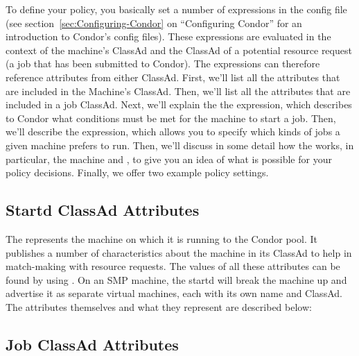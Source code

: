 To define your policy, you basically set a number of expressions in
the config file (see section~\ref{sec:Configuring-Condor} on
``Configuring Condor'' for an introduction to Condor's config files).
These expressions are evaluated in the context of the machine's ClassAd
and the ClassAd of a potential resource request (a job that has been
submitted to Condor).
The expressions can therefore reference attributes from either
ClassAd. 
First, we'll list all the attributes that are included in the Machine's
ClassAd.
Then, we'll list all the attributes that are included in a job
ClassAd. 
Next, we'll explain the the  expression, which describes
to Condor what conditions must be met for the machine to start a job.
Then, we'll describe the  expression, which allows you to
specify which kinds of jobs a given machine prefers to run.
Then, we'll discuss in some detail how the  works, in
particular, the machine  and , to give
you an idea of what is possible for your policy decisions.
Finally, we offer two example policy settings.

\subsection{\label{sec:Startd-Attributes}
Startd ClassAd Attributes}

The  represents the machine on which it is running to
the Condor pool.  It publishes a number of characteristics about the
machine in its ClassAd to help in match-making with resource requests.
The values of all these attributes can be found by using
.
On an SMP machine, the startd will break the machine up and advertise
it as separate virtual machines, each with its own name and ClassAd.
The attributes themselves and what they represent are described below:



\subsection{\label{sec:Job-Attributes}
Job ClassAd Attributes}

\Todo

